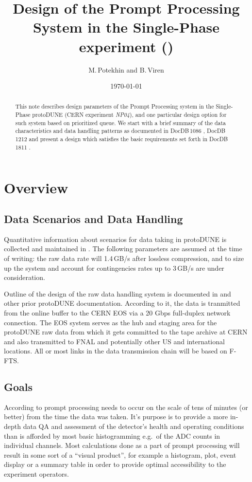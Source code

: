 \documentclass[pdftex,12pt,letter]{article}
\title{Design of the Prompt Processing System in the Single-Phase \pd experiment (\expname)}
\date{\today}
\author{M.\,Potekhin and B.\,Viren}
\newcommand{\pd}{protoDUNE\xspace}
\newcommand{\expname}{\textit{NP04}\xspace}
\begin{document}
\maketitle

\begin{abstract}
\noindent  This note describes design parameters of
the Prompt Processing system in the Single-Phase \pd
(CERN experiment \expname), and one particular design option for such system
based on prioritized queue. We start with a brief summary of the data characteristics and data handling patterns
as documented in DocDB\,1086 \cite{docdb1086}, DocDB\,1212 \cite{docdb1212} and present a design which
satisfies the basic requirements set forth in  DocDB 1811 \cite{docdb1811}.
\end{abstract}


\section{Overview}
\subsection{Data Scenarios and Data Handling}
\label{sec:rawdata}
Quantitative information about scenarios for data taking in \pd is collected and maintained in \cite{docdb1086}. The following parameters
are assumed at the time of writing: the raw data rate will 1.4\,GB/s after lossless compression, and to size up
the system and account for contingencies rates up to 3\,GB/s are under consideration.

Outline of the design of the raw data handling system is documented in  \cite{docdb1212} and other prior \pd documentation.
According to it, the data is tranmitted from the online buffer to the CERN EOS via a 20 Gbps full-duplex network connection.
The EOS system serves as the hub and staging area for the \pd raw data from which
it gets committed to the tape archive at CERN and also transmitted to FNAL and potentially
other US and international locations. All or most links in the data transmission chain will be based on F-FTS.

\subsection{Goals}
\label{sec:outline}
According to \cite{docdb1811}  prompt processing needs to occur on the scale
of tens of minutes (or better) from the time the data was taken. It's purpose is to
provide a more in-depth data QA and assessment of the detector's health and operating conditions
than is afforded by most basic histogramming e.g.~of the ADC counts in individual channels. Most calculations
done as a part of prompt processing will result in some sort of a ``visual product'', for example a histogram,
plot, event display or a summary table in order to provide optimal accessibility to the experiment
operators.
\end{document}
